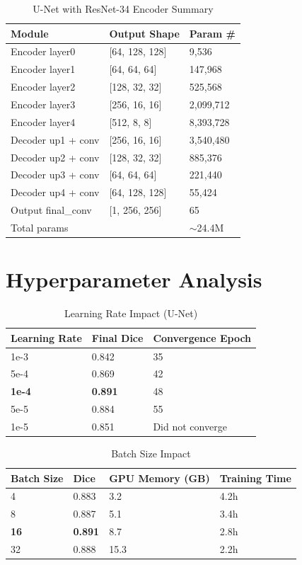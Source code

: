 \documentclass[11pt,a4paper]{article}
\begin{document}
\begin{table}[h]
\centering
\caption{U-Net with ResNet-34 Encoder Summary}
\begin{tabular}{lll}
\toprule
Module & Output Shape & Param \# \\
\midrule
Encoder layer0 & [64, 128, 128] & 9,536 \\
Encoder layer1 & [64, 64, 64] & 147,968 \\
Encoder layer2 & [128, 32, 32] & 525,568 \\
Encoder layer3 & [256, 16, 16] & 2,099,712 \\
Encoder layer4 & [512, 8, 8] & 8,393,728 \\
Decoder up1 + conv & [256, 16, 16] & 3,540,480 \\
Decoder up2 + conv & [128, 32, 32] & 885,376 \\
Decoder up3 + conv & [64, 64, 64] & 221,440 \\
Decoder up4 + conv & [64, 128, 128] & 55,424 \\
Output final\_conv & [1, 256, 256] & 65 \\
\midrule
Total params & & $\sim$24.4M \\
\bottomrule
\end{tabular}
\end{table}

\section{Hyperparameter Analysis}

\begin{table}[h]
\centering
\caption{Learning Rate Impact (U-Net)}
\begin{tabular}{lll}
\toprule
Learning Rate & Final Dice & Convergence Epoch \\
\midrule
1e-3 & 0.842 & 35 \\
5e-4 & 0.869 & 42 \\
\textbf{1e-4} & \textbf{0.891} & 48 \\
5e-5 & 0.884 & 55 \\
1e-5 & 0.851 & Did not converge \\
\bottomrule
\end{tabular}
\end{table}

\begin{table}[h]
\centering
\caption{Batch Size Impact}
\begin{tabular}{llll}
\toprule
Batch Size & Dice & GPU Memory (GB) & Training Time \\
\midrule
4 & 0.883 & 3.2 & 4.2h \\
8 & 0.887 & 5.1 & 3.4h \\
\textbf{16} & \textbf{0.891} & 8.7 & 2.8h \\
32 & 0.888 & 15.3 & 2.2h \\
\bottomrule
\end{tabular}
\end{table}
\end{document}
